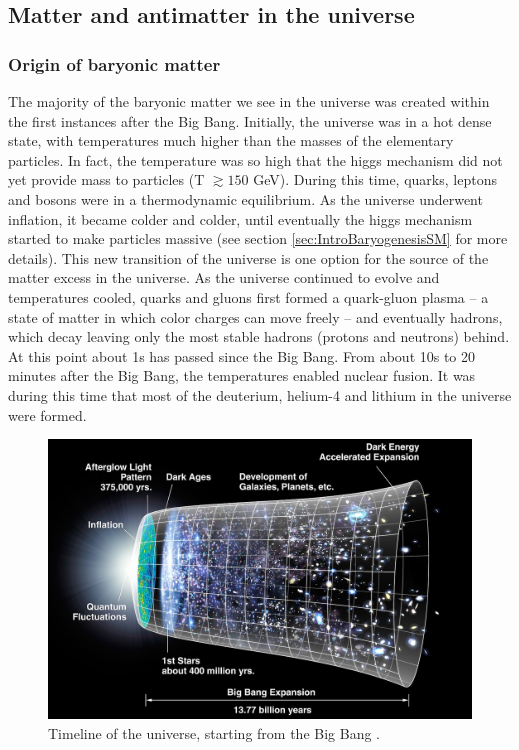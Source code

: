\subsection{Matter and antimatter in the universe}


\subsubsection{Origin of baryonic matter}
The majority of the baryonic matter we see in the universe was created within the first instances after the Big Bang. Initially, the universe was in a hot dense state, with temperatures much higher than the masses of the elementary particles. In fact, the temperature was so high that the higgs mechanism did not yet provide mass to particles\cite{Higgs_vev_highT} (T $\gtrsim 150$ GeV). During this time, quarks, leptons and bosons were in a thermodynamic equilibrium. As the universe underwent inflation, it became colder and colder, until eventually the higgs mechanism started to make particles massive\cite{Higgs_vev_highT} (see section \ref{sec:IntroBaryogenesisSM} for more details). This new transition of the universe is one option for the source of the matter excess in the universe.
As the universe continued to evolve and temperatures cooled, quarks and gluons first formed a quark-gluon plasma -- a state of matter in which color charges can move freely\cite{} --  and eventually hadrons, which decay leaving only the most stable hadrons (protons and neutrons) behind. At this point about 1s has passed since the Big Bang. From about 10s to 20 minutes after the Big Bang, the temperatures enabled nuclear fusion. It was during this time that most of the deuterium, helium-4 and lithium in the universe were formed. \\

\begin{figure}
    \centering
    \includegraphics[width=\textwidth]{figures/CMB_Timeline300_no_WMAP.jpg}
    \caption{Timeline of the universe, starting from the Big Bang \cite{timelineOfTheUniverse}.}
    \label{fig:TimelineOfTheUniverse}
\end{figure}

